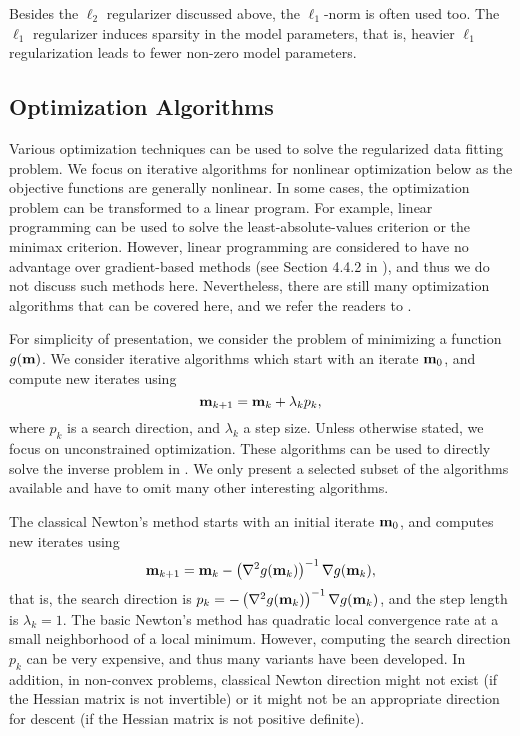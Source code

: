Besides the $\ell_{2}$ regularizer discussed above, the $\ell_{1}$-norm is
often used too.
The $\ell_{1}$ regularizer induces sparsity in the model parameters, that is,
heavier $\ell_{1}$ regularization leads to fewer non-zero model parameters.

\subsection{Optimization Algorithms}
\label{sec:optimization}

Various optimization techniques can be used to solve the regularized data
fitting problem.
We focus on iterative algorithms for nonlinear optimization below as the
objective functions are generally nonlinear.
In some cases, the optimization problem can be transformed to a linear program.
For example, linear programming can be used to solve the least-absolute-values
criterion or the minimax criterion.
However, linear programming are considered to have no advantage over
gradient-based methods (see Section 4.4.2 in \cite{tarantola2005inverse}), and
thus we do not discuss such methods here.
Nevertheless, there are still many optimization algorithms that can be covered
here, and we refer the readers to
\cite{bjorck1996numerical,nocedal2006numerical}.

For simplicity of presentation, we consider the problem of minimizing a
function $g({\bf m})$.
We consider iterative algorithms which start with an iterate ${\bf m}_0$, and
compute new iterates using
\begin{equation}
	{\bf m}_{k+1} = {\bf m}_{k} + \lambda_{k} p_{k},
\end{equation}
where $p_{k}$ is a search direction, and $\lambda_{k}$ a step size.
Unless otherwise stated, we focus on unconstrained optimization.
These algorithms can be used to directly solve the inverse problem in
. 
We only present a selected subset of the algorithms available and have to omit
many other interesting algorithms. 

\medskip{}
The classical Newton's method starts with an initial iterate ${\bf m}_{0}$, and computes new
iterates using 
\begin{equation}
	{\bf m}_{k+1} = {\bf m}_{k} - \left(\mathbf{\nabla}^2 g({\bf m}_{k})\right)^{-1} \mathbf{\nabla} g({\bf m}_{k}),
\end{equation}
that is, the search direction is 
$p_{k} = - \left(\mathbf{\nabla}^2 g({\bf m}_{k})\right)^{-1} \mathbf{\nabla} g({\bf m}_{k})$, and the step
length is $\lambda_{k} = 1$.
The basic Newton's method has quadratic local convergence rate at a small
neighborhood of a local minimum.
However, computing the search direction $p_{k}$ can be very expensive, and thus
many variants have been developed. In addition, in non-convex problems, classical Newton direction might not exist (if the Hessian matrix is not invertible) or it might not be an appropriate direction for descent (if the Hessian matrix is not positive definite). 

